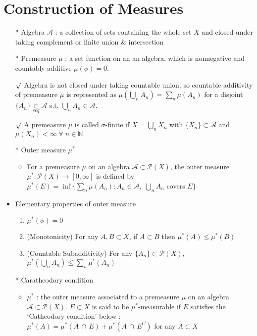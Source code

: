 \documentclass[12pt]{article}
\newcommand{\rmk}{$\surd$}
\newcommand{\N}{\mathbb{N}}
\newcommand{\A}{\mathcal{A}}
\newcommand{\seq}{\underset{seq}{\subset}}
\newcommand{\forany}{\; \forall \;}
\newcommand{\intersect}{\,\cap\,}
\begin{document}
\section{Construction of Measures}
\smallskip
\begin{itemize}
    \item [*] Algebra $\A$ : a collection of sets containing the whole set $X$ and closed under taking complement or finite union \& intersection
    \item [*] Premeasure $\mu$ : a set function on an an algebra, which is nonnegative and countably additive $\mu(\phi)=0$. 
    \item[\rmk] Algebra is not closed under taking countable union, so countable additivity of premeasure $\mu$ is represented as $\mu(\bigcup_n A_n)=\sum_n \mu(A_n)$ for a disjoint $\{A_n\}\seq \A$ s.t. $\bigcup_n A_n \in \A$. 
    \item[\rmk] A premeasure $\mu$ is called $\sigma$-finite if $X=\bigcup_n X_n$ with $\{X_n\}\subset \A$ and $\mu(X_n)<\infty \forany n\in \N$
    \item [*] Outer measure $\mu^*$ 
    \begin{itemize}
        \item For a premeasure $\mu$ on an algebra $\A\subset \mathcal{P}(X)$, the outer measure $\mu^* : \mathcal{P}(X)\rightarrow [0,\infty]$ is defined by $\mu^*(E)=\inf \{\sum_n \mu(A_n) : A_n\in \A,\; \bigcup_n A_n$ covers $E\}$ 
    \end{itemize}
    \item Elementary properties of outer measure
    \begin{enumerate}
        \item $\mu^*(\phi)=0$
        \item (Monotonicity) For any $A, B\subset X$, if $A\subset B$ then $\mu^*(A)\leq \mu^*(B)$
        \item (Countable Subadditivity) For any $\{A_n\}\subset \mathcal{P}(X)$, $\mu^*(\bigcup_n A_n)\leq \sum_n \mu^*(A_n)$
    \end{enumerate}
    \item [*] Caratheodory condition
    \begin{itemize}
        \item $\mu^*$ : the outer measure associated to a premeasure $\mu$ on an algebra $\A\subset \mathcal{P}(X)$. $E\subset X$ is said to be $\mu^*$-measurable if $E$ satisfies the `Catheodory condition' below : \\
        $\mu^*(A)=\mu^*(A\intersect E)+\mu^*(A\intersect E^C)$ for any $A\subset X$

\end{itemize}
\end{itemize}
\end{document}
